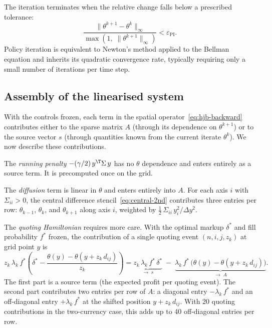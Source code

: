 The iteration terminates when the relative change falls below a prescribed tolerance:
\begin{equation}
  \frac{\|\theta^{k+1} - \theta^k\|_\infty}{\max(1,\;\|\theta^{k+1}\|_\infty)} < \varepsilon_{\text{PI}}.
\end{equation}
Policy iteration is equivalent to Newton's method applied to the Bellman equation and inherits its quadratic convergence rate, typically requiring only a small number of iterations per time step.


\subsection{Assembly of the linearised system}
\label{sec:pde-assembly}

With the controls frozen, each term in the spatial operator~\eqref{eq:hjb-backward} contributes either to the sparse matrix $A$ (through its dependence on $\theta^{k+1}$) or to the source vector $s$ (through quantities known from the current iterate $\theta^k$). We now describe these contributions.

The \emph{running penalty} $-(\gamma/2)\,y^\T \Sigma\,y$ has no $\theta$ dependence and enters entirely as a source term. It is precomputed once on the grid.

The \emph{diffusion} term is linear in $\theta$ and enters entirely into $A$. For each axis $i$ with $\Sigma_{ii} > 0$, the central difference stencil~\eqref{eq:central-2nd} contributes three entries per row: $\theta_{k-1}$, $\theta_k$, and $\theta_{k+1}$ along axis $i$, weighted by $\frac{1}{2}\,\Sigma_{ii}\,y_i^2 / \Delta y^2$.

The \emph{quoting Hamiltonian} requires more care. With the optimal markup $\delta^*$ and fill probability $f^*$ frozen, the contribution of a single quoting event $(n, i, j, z_k)$ at grid point $y$ is
\begin{equation}
  z_k\,\lambda_k\,f^*\!\left(\delta^* - \frac{\theta(y) - \theta(y + z_k\,d_{ij})}{z_k}\right)
  = \underbrace{z_k\,\lambda_k\,f^*\,\delta^*}_{\to\; s}
  \;-\; \underbrace{\lambda_k\,f^*\,\bigl(\theta(y) - \theta(y + z_k\,d_{ij})\bigr)}_{\to\; A}.
\end{equation}
The first part is a source term (the expected profit per quoting event). The second part contributes two entries per row of $A$: a diagonal entry $-\lambda_k\,f^*$ and an off-diagonal entry $+\lambda_k\,f^*$ at the shifted position $y + z_k\,d_{ij}$. With 20 quoting contributions in the two-currency case, this adds up to 40 off-diagonal entries per row.

